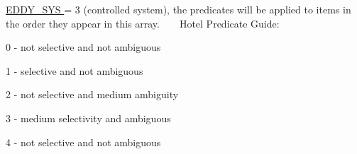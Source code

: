 \hyperlink{namespacedynamicfilterapp_1_1toggles_a549d2c90f3f5922ad1442df2113fca1b}{E\+D\+D\+Y\+\_\+\+S\+YS } = 3 (controlled system), the predicates will be applied to items in the order they appear in this array. ~\newline
~\newline
Hotel Predicate Guide\+:
\begin{DoxyItemize}
\item 0 -\/ not selective and not ambiguous
\item 1 -\/ selective and not ambiguous
\item 2 -\/ not selective and medium ambiguity
\item 3 -\/ medium selectivity and ambiguous
\item 4 -\/ not selective and not ambiguous
\end{DoxyItemize}

